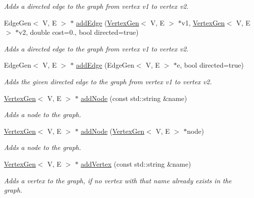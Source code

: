 \begin{DoxyCompactItemize}
\begin{DoxyCompactList}\small\item\em Adds a directed edge to the graph from vertex v1 to vertex v2. \end{DoxyCompactList}\item 
Edge\+Gen$<$ V, E $>$ $\ast$ \mbox{\hyperlink{classBasicGraphGen_ac2fe8fab4722e89853df8ed385aa7a26}{add\+Edge}} (\mbox{\hyperlink{classVertexGen}{Vertex\+Gen}}$<$ V, E $>$ $\ast$v1, \mbox{\hyperlink{classVertexGen}{Vertex\+Gen}}$<$ V, E $>$ $\ast$v2, double cost=0., bool directed=true)
\begin{DoxyCompactList}\small\item\em Adds a directed edge to the graph from vertex v1 to vertex v2. \end{DoxyCompactList}\item 
Edge\+Gen$<$ V, E $>$ $\ast$ \mbox{\hyperlink{classBasicGraphGen_a92cffe0dd5b70ab78a3bce486fd60637}{add\+Edge}} (Edge\+Gen$<$ V, E $>$ $\ast$e, bool directed=true)
\begin{DoxyCompactList}\small\item\em Adds the given directed edge to the graph from vertex v1 to vertex v2. \end{DoxyCompactList}\item 
\mbox{\hyperlink{classVertexGen}{Vertex\+Gen}}$<$ V, E $>$ $\ast$ \mbox{\hyperlink{classGraph_acd763aa09491315536b5d2734cd82b89}{add\+Node}} (const std\+::string \&name)
\begin{DoxyCompactList}\small\item\em Adds a node to the graph. \end{DoxyCompactList}\item 
\mbox{\hyperlink{classVertexGen}{Vertex\+Gen}}$<$ V, E $>$ $\ast$ \mbox{\hyperlink{classGraph_a635fa78d72315816cef6c091acfa3882}{add\+Node}} (\mbox{\hyperlink{classVertexGen}{Vertex\+Gen}}$<$ V, E $>$ $\ast$node)
\begin{DoxyCompactList}\small\item\em Adds a node to the graph. \end{DoxyCompactList}\item 
\mbox{\hyperlink{classVertexGen}{Vertex\+Gen}}$<$ V, E $>$ $\ast$ \mbox{\hyperlink{classBasicGraphGen_a60f19882208c6d1dc51b74d5f348f458}{add\+Vertex}} (const std\+::string \&name)
\begin{DoxyCompactList}\small\item\em Adds a vertex to the graph, if no vertex with that name already exists in the graph. \end{DoxyCompactList}\item 

\end{DoxyCompactItemize}
